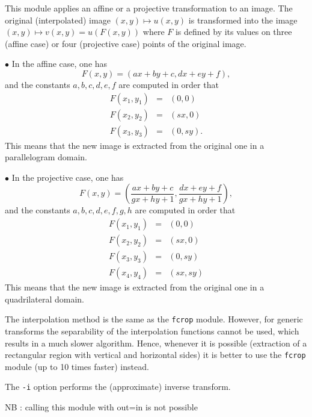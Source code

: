 This module applies an affine or a projective transformation to an image.
The original (interpolated) 
image $(x,y)\mapsto u(x,y)$ is transformed into the image
$(x,y)\mapsto v(x,y)=u(F(x,y))$ where $F$ is defined by its values on three
(affine case) or four (projective case) points of the original 
image. 

\medskip

$\bullet$ In the affine case, one has
$$F(x,y) = (a x + b y +c, d x +  e y + f),$$
and the constants $a,b,c,d,e,f$ are computed in order that
\begin{eqnarray*}
F(x_1,y_1) &=& (0,0) \\
F(x_2,y_2) &=& (sx,0) \\
F(x_3,y_3) &=& (0,sy) .
\end{eqnarray*}
This means that the new image is extracted from the original one 
in a parallelogram domain.

\medskip

$\bullet$ In the projective case, one has
$$F(x,y) = \left(\frac{a x + b y +c}{gx + hy +1}, 
\frac{d x + e y + f}{gx + hy +1}\right),$$
and the constants $a,b,c,d,e,f,g,h$ are computed in order that
\begin{eqnarray*}
F(x_1,y_1) &=& (0,0) \\
F(x_2,y_2) &=& (sx,0) \\
F(x_3,y_3) &=& (0,sy) \\
F(x_4,y_4) &=& (sx,sy) 
\end{eqnarray*}
This means that the new image is extracted from the original one 
in a quadrilateral domain.

\bigskip

The interpolation method is the same as the \verb+fcrop+ module.
However, for generic transforms the separability of the interpolation
functions cannot be used, which results in a much slower algorithm.
Hence, whenever it is possible (extraction of a rectangular region with 
vertical and horizontal sides) it is better to use the \verb+fcrop+ 
module (up to 10 times faster) instead.

\medskip

The \verb+-i+ option performs the (approximate) inverse transform.

\medskip

NB : calling this module with out=in is not possible
